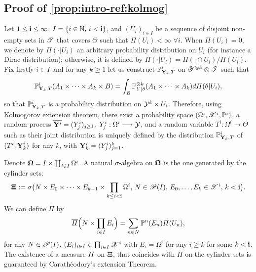 \subsection{Proof of \cref{prop:intro-ref:kolmog}}\label{sec:intro-ref:proof}



Let $1\leq\mathbf{i}\leq\infty$, $I=\{i\in\mathbb{N},\,i<\mathbf{i}\}$, and $(U_i)_{i\in I}$ be a sequence of disjoint non-empty sets in $\mathscr{T}$ that covers $\Theta$ such that $\varPi(U_i)<\infty$ $\forall i$.
When $\varPi(U_i)=0$, we denote by $\varPi(\cdot|U_i)$ an arbitrary probability distribution on $U_i$ (for instance a Dirac distribution); otherwise, it is defined by $\varPi(\cdot|U_i)=\varPi(\cdot\cap U_i)/\varPi(U_i)$.
    Fix firstly $i\in I$ and for any $k\geq1$ let us construct $\mathbb{P}_{\mathbf{Y}_k,T}^i$ on $\mathscr{Y}^{\otimes k}\otimes\mathscr{T}$ such that
        \begin{equation}
            \mathbb{P}_{\mathbf{Y}_k,T}^i(A_1\times\dots\times A_k\times B) = \int_B \mathbb{P}_{Y|\theta}^{\otimes k}(A_1\times\dots\times A_k)d\varPi(\theta|U_i),
        \end{equation}
     so that $\mathbb{P}^i_{\mathbf{Y}_k,T}$ is a probability distribution on $\mathcal{Y}^k\times U_i$. 
    Therefore, using Kolmogorov extension theorem, there exist a probability space $(\Omega^i,\mathscr{X}^i,\mathbb{P}^i)$, a random process $\overline{\mathbf{Y}^i}=(Y^i_j)_{j\geq1}$, $Y_j^i:\Omega^i\longrightarrow\mathcal{Y}$, and a random variable $T^i:\Omega^i\to\Theta$ such as  their joint distribution is uniquely defined by the distribution
    $\mathbb{P}^i_{\mathbf{Y}_k,T}$ of $(T^i,\mathbf{Y}_k^i)$ for any $k$, with $\mathbf{Y}_k^i=(Y_j^i)_{j=1}^k$.



Denote $\mathbf{\Omega}= I \times\prod_{i\in I}\Omega^i$. A natural $\sigma$-algebra on $\mathbf{\Omega}$ is the one generated by the cylinder sets:
\begin{equation}
    \mathbf{\Xi} := \sigma\big(N\times E_0\times\dots\times E_{k-1}\times\prod_{k\leq i<\mathbf{i}}\Omega^i,\,N\in\mathscr{P}(I),\, E_0,\dots,E_k\in\mathscr{X}^i,\,k<\mathbf{i} \big).
\end{equation}
We can define $\overline\varPi$ by
    \begin{equation}
        \overline\varPi\Big(N\times\prod_{i\in I}E_i\Big) = \sum_{n\in N}\mathbb{P}^n(E_n)\varPi(U_n),
    \end{equation}
for any $N\in\mathscr{P}(I)$, $(E_i)_{i \in I} \in\prod_{i\in I}\mathscr{X}^i$ with $E_i=\Omega^i$ for any $i\geq k$ for some $k<\mathbf{i}$. 
The existence of a measure $\mathbf{\varPi}$ on $\mathbf{\Xi}$, that coincides with $\overline\varPi$ on the cylinder sets is guaranteed by  Carathéodory's extension Theorem. %




